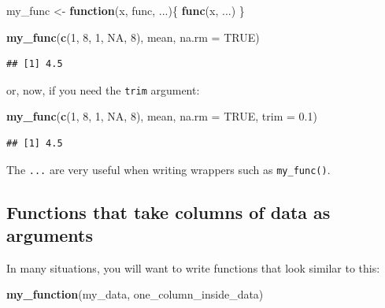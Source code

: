 \documentclass[]{gitbook}
\newenvironment{Shaded}{\begin{snugshade}}{\end{snugshade}}
\newcommand{\ControlFlowTok}[1]{\textcolor[rgb]{0.13,0.29,0.53}{\textbf{#1}}}
\newcommand{\DataTypeTok}[1]{\textcolor[rgb]{0.13,0.29,0.53}{#1}}
\newcommand{\DecValTok}[1]{\textcolor[rgb]{0.00,0.00,0.81}{#1}}
\newcommand{\FloatTok}[1]{\textcolor[rgb]{0.00,0.00,0.81}{#1}}
\newcommand{\KeywordTok}[1]{\textcolor[rgb]{0.13,0.29,0.53}{\textbf{#1}}}
\newcommand{\NormalTok}[1]{#1}
\newcommand{\OtherTok}[1]{\textcolor[rgb]{0.56,0.35,0.01}{#1}}
\newcommand{\StringTok}[1]{\textcolor[rgb]{0.31,0.60,0.02}{#1}}
\theoremstyle{definition}
\theoremstyle{definition}
\theoremstyle{definition}
\theoremstyle{remark}
\begin{document}
\begin{Shaded}
\begin{Highlighting}[]
\NormalTok{my_func <-}\StringTok{ }\ControlFlowTok{function}\NormalTok{(x, func, ...)\{}
  \KeywordTok{func}\NormalTok{(x, ...)}
\NormalTok{\}}

\KeywordTok{my_func}\NormalTok{(}\KeywordTok{c}\NormalTok{(}\DecValTok{1}\NormalTok{, }\DecValTok{8}\NormalTok{, }\DecValTok{1}\NormalTok{, }\OtherTok{NA}\NormalTok{, }\DecValTok{8}\NormalTok{), mean, }\DataTypeTok{na.rm =} \OtherTok{TRUE}\NormalTok{)}
\end{Highlighting}
\end{Shaded}

\begin{verbatim}
## [1] 4.5
\end{verbatim}

or, now, if you need the \texttt{trim} argument:

\begin{Shaded}
\begin{Highlighting}[]
\KeywordTok{my_func}\NormalTok{(}\KeywordTok{c}\NormalTok{(}\DecValTok{1}\NormalTok{, }\DecValTok{8}\NormalTok{, }\DecValTok{1}\NormalTok{, }\OtherTok{NA}\NormalTok{, }\DecValTok{8}\NormalTok{), mean, }\DataTypeTok{na.rm =} \OtherTok{TRUE}\NormalTok{, }\DataTypeTok{trim =} \FloatTok{0.1}\NormalTok{)}
\end{Highlighting}
\end{Shaded}

\begin{verbatim}
## [1] 4.5
\end{verbatim}

The \texttt{...} are very useful when writing wrappers such as
\texttt{my\_func()}.

\hypertarget{functions-that-take-columns-of-data-as-arguments}{%
\subsection{Functions that take columns of data as
arguments}\label{functions-that-take-columns-of-data-as-arguments}}

In many situations, you will want to write functions that look similar
to this:

\begin{Shaded}
\begin{Highlighting}[]
\KeywordTok{my_function}\NormalTok{(my_data, one_column_inside_data)}
\end{Highlighting}
\end{Shaded}
\end{document}
